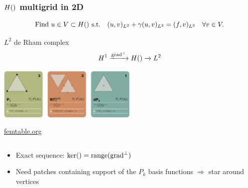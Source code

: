 \documentclass[presentation,aspectratio=43, 10pt]{beamer}
\DeclareMathOperator{\grad}{grad}
\let\div\relax
\DeclareMathOperator{\div}{div}
\DeclareMathOperator{\range}{range}
\begin{document}
\begin{frame}[t,fragile]
  \frametitle{$H(\div)$ multigrid in 2D {\small\parencite{Arnold:1997}}}
  \vspace{-1.5\baselineskip}
  \begin{equation*}
    \text{Find $u \in V \subset H(\div)$ s.t.}\quad (u, v)_{L^2} + \gamma (\div u, \div v)_{L^2} = (f, v)_{L^2} \quad \forall v \in V.
  \end{equation*}
  \vspace*{-\baselineskip}
  \begin{block}{$L^2$ de Rham complex}
    \begin{equation*}
      H^1 \xrightarrow{\grad^\perp}  H(\div) \xrightarrow{\div} L^2
    \end{equation*}
    \vspace*{-2\baselineskip}
    \pause
    \begin{center}
      \includegraphics[width=0.5\textwidth]{rt-2d}
    \end{center}
    \vspace*{-\baselineskip}
    {\hfill \url{femtable.org}}
  \end{block}
  \pause
  \begin{columns}
    \begin{column}{0.7\textwidth}
      \begin{itemize}
      \item Exact sequence: $\ker(\div) = \range(\grad^\perp)$
      \item Need patches containing support of the $P_k$ basis
        functions $\Rightarrow$ star around vertices
      \end{itemize}
    \end{column}
    \begin{column}{0.3\textwidth}
\end{column}
\end{columns}
\end{frame}
\end{document}
